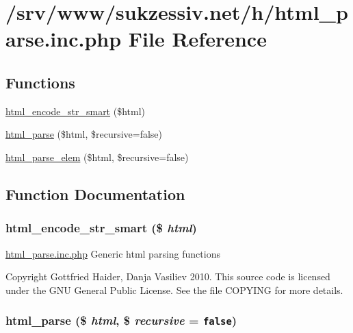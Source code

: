 \hypertarget{html__parse_8inc_8php}{
\section{/srv/www/sukzessiv.net/h/html\_\-parse.inc.php File Reference}
\label{html__parse_8inc_8php}
}
\subsection*{Functions}
\begin{CompactItemize}
\item 
\hyperlink{html__parse_8inc_8php_7eda4037f4b2576b3bcd97408ff95bd5}{html\_\-encode\_\-str\_\-smart} (\$html)
\item 
\hyperlink{html__parse_8inc_8php_1003b146f08aef5a3a78d75a3538a4d7}{html\_\-parse} (\$html, \$recursive=false)
\item 
\hyperlink{html__parse_8inc_8php_6d9c21ee610953fb5b5b64fae3f74ed3}{html\_\-parse\_\-elem} (\$html, \$recursive=false)
\end{CompactItemize}


\subsection{Function Documentation}
\hypertarget{html__parse_8inc_8php_7eda4037f4b2576b3bcd97408ff95bd5}{
\subsubsection[{html\_\-encode\_\-str\_\-smart}]{\setlength{\rightskip}{0pt plus 5cm}html\_\-encode\_\-str\_\-smart (\$ {\em html})}}
\label{html__parse_8inc_8php_7eda4037f4b2576b3bcd97408ff95bd5}


\hyperlink{html__parse_8inc_8php}{html\_\-parse.inc.php} Generic html parsing functions

Copyright Gottfried Haider, Danja Vasiliev 2010. This source code is licensed under the GNU General Public License. See the file COPYING for more details. \hypertarget{html__parse_8inc_8php_1003b146f08aef5a3a78d75a3538a4d7}{
\subsubsection[{html\_\-parse}]{\setlength{\rightskip}{0pt plus 5cm}html\_\-parse (\$ {\em html}, \/  \$ {\em recursive} = {\tt false})}}
\label{html__parse_8inc_8php_1003b146f08aef5a3a78d75a3538a4d7}


